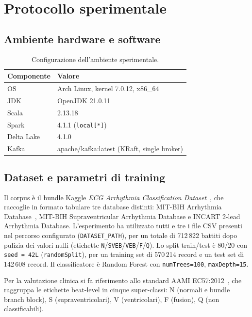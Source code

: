 \section{Protocollo sperimentale}\label{sec:protocollo-sperimentale}

\subsection{Ambiente hardware e software}

\begin{table}[H]
  \centering
  \caption{Configurazione dell'ambiente sperimentale.}
  \label{tab:setup-sperimentale}
  \begin{tabular}{@{}ll@{}}
    \toprule
    \textbf{Componente} & \textbf{Valore} \\
    \midrule
    OS & Arch Linux, kernel 7.0.12, x86\_64 \\
    JDK & OpenJDK 21.0.11 \\
    Scala & 2.13.18 \\
    Spark & 4.1.1 (\texttt{local[*]}) \\
    Delta Lake & 4.1.0 \\
    Kafka & apache/kafka:latest (KRaft, single broker) \\
    \bottomrule
  \end{tabular}
\end{table}

\subsection{Dataset e parametri di training}

Il corpus è il bundle Kaggle \emph{ECG Arrhythmia Classification Dataset}~\cite{sakib2021kaggle,sakib2021edge}, che raccoglie in formato tabulare tre database distinti: MIT-BIH Arrhythmia Database~\cite{moody2001impact,goldberger2000physiobank}, MIT-BIH Supraventricular Arrhythmia Database e INCART 2-lead Arrhythmia Database.
L'esperimento ha utilizzato tutti e tre i file CSV presenti nel percorso configurato (\texttt{DATASET\_PATH}), per un totale di 712\,822 battiti dopo pulizia dei valori nulli (etichette \texttt{N}/\texttt{SVEB}/\texttt{VEB}/\texttt{F}/\texttt{Q}).
Lo split train/test è 80/20 con \texttt{seed = 42L} (\texttt{randomSplit}), per un training set di 570\,214 record e un test set di 142\,608 record.
Il classificatore è Random Forest con \texttt{numTrees=100}, \texttt{maxDepth=15}.

Per la valutazione clinica si fa riferimento allo standard AAMI EC57:2012~\cite{aami2012ec57}, che raggruppa le etichette beat-level in cinque super-classi: N (normali e bundle branch block), S (supraventricolari), V (ventricolari), F (fusion), Q (non classificabili).

